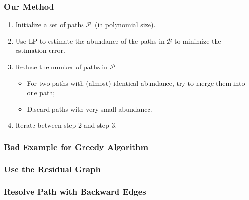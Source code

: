 \frame
{
	\frametitle{Our Method}
	\begin{enumerate}
	\item Initialize a set of paths $\mathcal{P}$~(in polynomial size).
	\vspace{0.2cm}
	\item Use LP to estimate the abundance of the paths in $\mathcal{B}$ to minimize the estimation error.
	\vspace{0.2cm}
	\item Reduce the number of paths in $\mathcal{P}$:
		\begin{itemize}
		\vspace{0.1cm}
		\item For two paths with (almost) identical abundance, try to merge them into one path;
		\vspace{0.1cm}
		\item Discard paths with very small abundance.
		\end{itemize}
	\vspace{0.2cm}
	\item Iterate between step 2 and step 3.
	\end{enumerate}
}

\frame
{
	\frametitle{Bad Example for Greedy Algorithm}

	\vspace{0.2cm}
	
	\vspace{0.8cm}

	\vspace{1.5cm}
	
	\vspace{0.8cm}
}

\frame
{
	\frametitle{Use the Residual Graph}

	\vspace{-3.4cm}
	
}

\frame
{
	\frametitle{Resolve Path with Backward Edges}

	\vspace{0.2cm}
	
	\vspace{4.3cm}
}

